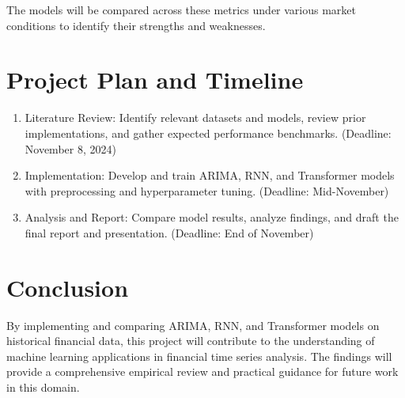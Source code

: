 \documentclass[12pt, letterpaper]{article}
\begin{document}
    The models will be compared across these metrics under various market conditions to identify their strengths and weaknesses.
\section*{Project Plan and Timeline}
    \begin{enumerate}[label=-]
        \item Literature Review: Identify relevant datasets and models, review prior implementations, and gather expected performance benchmarks. (Deadline: November 8, 2024)
        \item Implementation: Develop and train ARIMA, RNN, and Transformer models with preprocessing and hyperparameter tuning. (Deadline: Mid-November)
        \item Analysis and Report: Compare model results, analyze findings, and draft the final report and presentation. (Deadline: End of November)
    \end{enumerate}
    
\section*{Conclusion}
    By implementing and comparing ARIMA, RNN, and Transformer models on historical financial data, this project will contribute to the understanding of machine learning applications in financial time series analysis. The findings will provide a comprehensive empirical review and practical guidance for future work in this domain.
\end{document}
